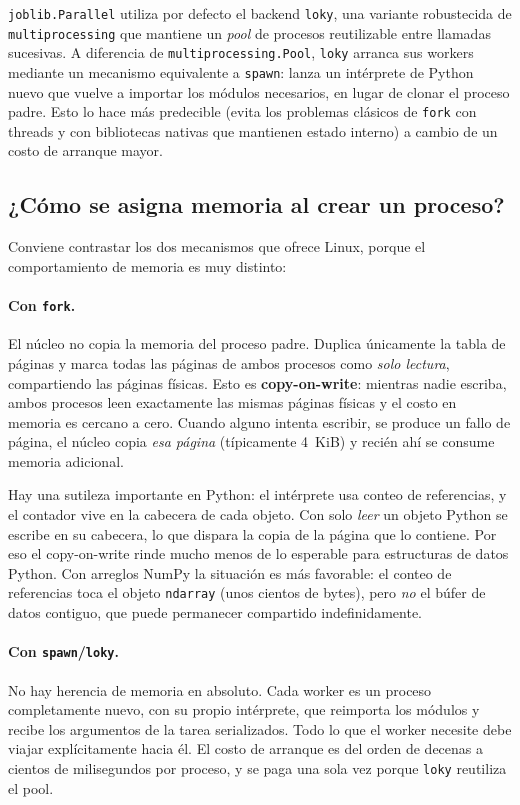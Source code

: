 \documentclass[11pt,letterpaper]{article}
\begin{document}
\texttt{joblib.Parallel} utiliza por defecto el backend \texttt{loky}, una variante
robustecida de \texttt{multiprocessing} que mantiene un \emph{pool} de procesos
reutilizable entre llamadas sucesivas. A diferencia de \texttt{multiprocessing.Pool},
\texttt{loky} arranca sus workers mediante un mecanismo equivalente a \texttt{spawn}:
lanza un intérprete de Python nuevo que vuelve a importar los módulos necesarios, en
lugar de clonar el proceso padre. Esto lo hace más predecible (evita los problemas
clásicos de \texttt{fork} con threads y con bibliotecas nativas que mantienen estado
interno) a cambio de un costo de arranque mayor.

\subsection{¿Cómo se asigna memoria al crear un proceso?}

Conviene contrastar los dos mecanismos que ofrece Linux, porque el comportamiento de
memoria es muy distinto:

\paragraph{Con \texttt{fork}.} El núcleo no copia la memoria del proceso padre. Duplica
únicamente la tabla de páginas y marca todas las páginas de ambos procesos como
\emph{solo lectura}, compartiendo las páginas físicas. Esto es \textbf{copy-on-write}:
mientras nadie escriba, ambos procesos leen exactamente las mismas páginas físicas y el
costo en memoria es cercano a cero. Cuando alguno intenta escribir, se produce un fallo
de página, el núcleo copia \emph{esa página} (típicamente 4~KiB) y recién ahí se
consume memoria adicional.

Hay una sutileza importante en Python: el intérprete usa conteo de referencias, y el
contador vive en la cabecera de cada objeto. Con solo \emph{leer} un objeto Python se
escribe en su cabecera, lo que dispara la copia de la página que lo contiene. Por eso
el copy-on-write rinde mucho menos de lo esperable para estructuras de datos Python.
Con arreglos NumPy la situación es más favorable: el conteo de referencias toca el
objeto \texttt{ndarray} (unos cientos de bytes), pero \emph{no} el búfer de datos
contiguo, que puede permanecer compartido indefinidamente.

\paragraph{Con \texttt{spawn}/\texttt{loky}.} No hay herencia de memoria en absoluto.
Cada worker es un proceso completamente nuevo, con su propio intérprete, que reimporta
los módulos y recibe los argumentos de la tarea serializados. Todo lo que el worker
necesite debe viajar explícitamente hacia él. El costo de arranque es del orden de
decenas a cientos de milisegundos por proceso, y se paga una sola vez porque
\texttt{loky} reutiliza el pool.
\end{document}
